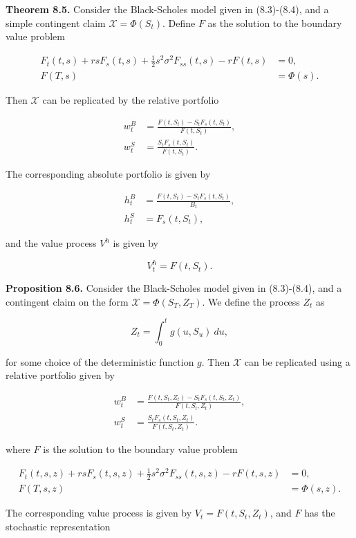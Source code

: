 \documentclass[
]{article}
\begin{document}
\textbf{Theorem 8.5.} Consider the Black-Scholes model given in
(8.3)-(8.4), and a simple contingent claim \(\mathcal{X}=\Phi(S_t)\).
Define \(F\) as the solution to the boundary value problem

\begin{align*}
F_t(t,s)+rsF_s(t,s)+\frac{1}{2}s^2\sigma^2F_{ss}(t,s)-rF(t,s)&=0,\\
F(T,s)&=\Phi(s).
\end{align*}

Then \(\mathcal{X}\) can be replicated by the relative portfolio

\begin{align*}
w_t^B&=\frac{F(t,S_t)-S_tF_s(t,S_t)}{F(t,S_t)},\\
w_t^S&=\frac{S_tF_s(t,S_t)}{F(t,S_t)}.
\end{align*}

The corresponding absolute portfolio is given by

\begin{align*}
h_t^B&=\frac{F(t,S_t)-S_tF_s(t,S_t)}{B_t},\\
h_t^S&=F_s(t,S_t),
\end{align*}

and the value process \(V^h\) is given by

\[
V^h_t=F(t,S_t).
\]

\textbf{Proposition 8.6.} Consider the Black-Scholes model given in
(8.3)-(8.4), and a contingent claim on the form
\(\mathcal{X}=\Phi(S_T,Z_T)\). We define the process \(Z_t\) as

\[
Z_t=\int_0^tg(u,S_u)\ du,
\]

for some choice of the deterministic function \(g\). Then
\(\mathcal{X}\) can be replicated using a relative portfolio given by

\begin{align*}
w_t^B&=\frac{F(t,S_t,Z_t)-S_tF_s(t,S_t,Z_t)}{F(t,S_t,Z_t)},\\
w_t^S&=\frac{S_tF_s(t,S_t,Z_t)}{F(t,S_t,Z_t)}.
\end{align*}

where \(F\) is the solution to the boundary value problem

\begin{align*}
F_t(t,s,z)+rsF_s(t,s,z)+\frac{1}{2}s^2\sigma^2F_{ss}(t,s,z)-rF(t,s,z)&=0,\\
F(T,s,z)&=\Phi(s,z).
\end{align*}

The corresponding value process is given by \(V_t=F(t,S_t,Z_t)\), and
\(F\) has the stochastic representation
\end{document}
